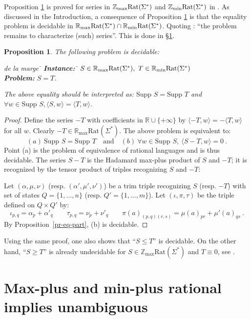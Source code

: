 \documentclass{article}
\newtheorem{prpstn}[thrm]{Proposition}
\newcommand{\mrm}[1]{\text{\rm #1}}
\newcommand{\supp}[1]{\text{Supp }#1}
\newcommand{\Z} {\ensuremath{\mathbb{Z}}}
\newcommand{\R} {\ensuremath{\mathbb{R}}}
\newcommand{\Zmin} {\Z_{\min}}
\newcommand{\Zmax} {\Z_{\max}}
\newcommand{\Rmin} {\R_{\min}}
\newcommand{\Rmax} {\R_{\max}}
\newcommand{\1}{\mathbb{1}}
\newcommand{\0}{\mathbb{0}}
\newcommand{\coef}[2]{\langle #1, #2\rangle}
\def\Rat{\text{Rat}}
\def\ab{\Sigma}
\begin{document}
Proposition \ref{pr-maxmin} is proved for series in
$\Zmax\mrm{Rat}(\ab^*)$ and $\Zmin\mrm{Rat}(\ab^*)$ in
\cite[Proposition 5.3]{krob94}. As discussed in the Introduction, a
consequence of Proposition \ref{pr-maxmin} is that the equality problem is decidable in
$\Rmax\mrm{Rat}(\ab^*) \cap \Rmin\mrm{Rat}(\ab^*)$. Quoting
\cite{krob94}: ``the problem remains to characterize (such)
series''. This is done in \S \ref{se-minmax}. 

\begin{prpstn}
\label{pr-maxmin}
The following problem is decidable:
\begin{tabbing} 
de la marge \= \kill
\> {\bf Instance:} \hspace*{0.4cm} \= $S\in \Rmax\mrm{Rat}(\ab^*),\
T\in \Rmin\mrm{Rat}(\ab^*)$  \\ 
\>  {\bf Problem:} \> $S=T$\:.
\end{tabbing}
The above equality should be interpreted as: $\supp{S}=\supp{T}$ and
$\forall w\in \supp{S}, \coef{S}{w}=\coef{T}{w}$. 
\end{prpstn} 
\begin{proof}
Define the series $-T$ with coefficients in $\R\cup\{+\infty\}$ by
$\coef{-T}{w}=-\coef{T}{w}$ for all $w$. Clearly $-T \in
\Rmax\Rat(\ab^*)$. The above problem is equivalent to:
\[
(a)\ \supp{S}=\supp{T}\quad\text{and}\quad 
(b)\ \forall w\in\supp{S},\
\coef{S-T}{w}=0\:. 
\] 
Point (a) is the problem of equivalence of rational languages and is thus
decidable. 
The series $S-T$ is the Hadamard max-plus product of $S$ and $-T$;
it is recognized by the tensor product of triples recognizing $S$ and $-T$:

Let $(\alpha,\mu,\nu)$ (resp. $(\alpha',\mu',\nu')$) be a trim triple
recognizing $S$ (resp. $-T$) with set of states $Q=\{1,\ldots,n\}$
(resp. $Q'=\{1,\ldots,m\}$). 
Let $(\iota,\pi,\tau)$ be the triple defined on $Q\times Q'$ by:
\begin{equation*}
\iota_{p,q}=\alpha_p+\alpha'_q\qquad
\tau_{p,q}=\nu_p+\nu'_q \qquad
\pi(a)_{(p,q)(r,s)}=\mu(a)_{pr}+\mu'(a)_{qs}\:.
\end{equation*}
By Proposition~\ref{pr-eq-part}, (b) is decidable.
\end{proof}

Using the same proof, one also shows that ``$S\leq T$'' is
decidable. On the other hand, ``$S\geq T$'' is already undecidable for
$S\in \Zmax\Rat(\ab^*)$ and $T\equiv 0$, see \cite{krob}. 

\section{Max-plus and min-plus rational implies
  unambiguous}\label{se-minmax}
\end{document}

